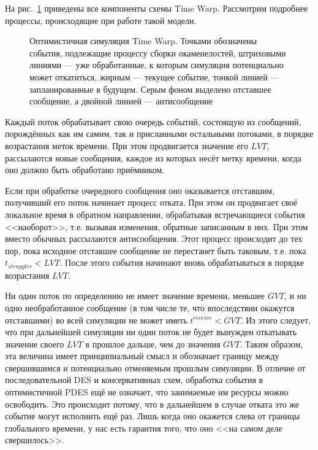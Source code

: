 На рис.~\ref{fig:time-warp} приведены все компоненты схемы Time Warp. Рассмотрим подробнее процессы, происходящие при работе такой модели.

\begin{figure}[htbp]
	\centering
    \caption[Симуляция Time Warp]{Оптимистичная симуляция Time Warp. Точками обозначены события, подлежащие процессу сборки окаменелостей, штриховыми линиями — уже обработанные, к которым симуляция потенциально может откатиться, жирным — текущее событие, тонкой линией — запланированные в будущем. Серым фоном выделено отставшее сообщение, а двойной линией — антисообщение}
    \label{fig:time-warp}
\end{figure}

\begin{itemize*}
\item Каждый поток обрабатывает свою очередь событий, состоящую из сообщений, порождённых как им самим, так и присланными остальными потоками, в порядке возрастания меток времени. При этом продвигается значение его $LVT$, рассылаются новые сообщения, каждое из которых несёт метку времени, когда оно должно быть обработано приёмником.

\item Если при обработке очередного сообщения оно оказывается отставшим, получивший его поток начинает процесс отката. При этом он продвигает своё локальное время в обратном направлении, обрабатывая встречающиеся события <<наоборот>>, т.е. вызывая изменения, обратные записанным в них. При этом вместо обычных рассылаются антисообщения. Этот процесс происходит до тех пор, пока исходное отставшее сообщение не перестанет быть таковым, т.е. пока $t_{straggler} < LVT$. После этого события начинают вновь обрабатываться в порядке возрастания $LVT$.

\item Ни один поток по определению не имеет значение времени, меньшее $GVT$, и ни одно необработанное сообщение (в том числе те, что впоследствии окажутся отставшими) во всей симуляции не может иметь $t^{receive} < GVT$. Из этого следует, что при дальнейшей симуляции ни один поток не будет вынужден откатывать значение своего $LVT$ в прошлое дальше, чем до значения $GVT$. Таким образом, эта величина имеет принципиальный смысл и обозначает границу между свершившимся и потенциально отменяемым прошлым симуляции. В отличие от последовательной DES и консервативных схем, обработка события в оптимистичной PDES ещё не означает, что занимаемые им ресурсы можно освободить. Это происходит потому, что в дальнейшем в случае отката это же событие могут исполнить ещё раз. Лишь когда оно окажется слева от границы глобального времени, у нас есть гарантия того, что оно <<на самом деле свершилось>>.

\end{itemize*}

